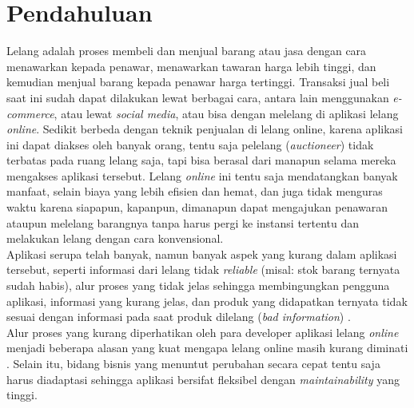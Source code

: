 
\section{Pendahuluan}
Lelang adalah proses membeli dan menjual barang atau jasa dengan cara menawarkan kepada penawar, menawarkan tawaran harga lebih tinggi, dan kemudian menjual barang kepada penawar harga tertinggi\cite{balailelang_sejarah_nodate}. Transaksi jual beli saat ini sudah dapat dilakukan lewat berbagai cara, antara lain menggunakan \textit{e-commerce}, atau lewat \textit{social media}, atau bisa dengan melelang di aplikasi lelang \textit{online}. Sedikit berbeda dengan teknik penjualan di lelang online, karena aplikasi ini dapat diakses oleh banyak orang, tentu saja pelelang (\textit{auctioneer}) tidak terbatas pada ruang lelang saja, tapi bisa berasal dari manapun selama mereka mengakses aplikasi tersebut.  Lelang \textit{online} ini tentu saja mendatangkan banyak manfaat, selain biaya yang lebih efisien dan hemat, dan juga tidak menguras waktu karena siapapun, kapanpun, dimanapun dapat mengajukan penawaran ataupun melelang barangnya tanpa harus pergi ke instansi tertentu dan melakukan lelang dengan cara konvensional.\\
\indent Aplikasi serupa telah banyak, namun banyak aspek yang kurang dalam aplikasi tersebut, seperti informasi dari lelang tidak \textit{reliable} (misal: stok barang ternyata sudah habis), alur proses yang tidak jelas sehingga membingungkan pengguna aplikasi, informasi yang kurang jelas, dan produk yang didapatkan ternyata tidak sesuai dengan informasi pada saat produk dilelang (\textit{bad information}) \cite{ying-feng_kuo_online_2016}.\\
\indent Alur proses yang kurang diperhatikan oleh para developer aplikasi lelang \textit{online} menjadi beberapa alasan yang kuat mengapa lelang online masih kurang diminati \cite{noauthor_sistem_nodate}. Selain itu, bidang bisnis yang menuntut perubahan secara cepat tentu saja harus diadaptasi sehingga aplikasi bersifat fleksibel dengan \textit{maintainability} yang tinggi.

